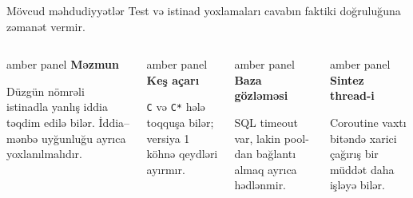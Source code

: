 \documentclass[aspectratio=169,11pt]{beamer}
\newenvironment{amberpanel}{\begin{beamercolorbox}[wd=\linewidth,sep=1.2ex,rounded=true]{amber panel}}{\end{beamercolorbox}}
\newcommand{\lead}[1]{{\color{muted}\normalsize #1}\par\vspace{0.75em}}
\begin{document}
\begin{frame}{Mövcud məhdudiyyətlər}
  \lead{Test və istinad yoxlamaları cavabın faktiki doğruluğuna zəmanət vermir.}
  \begin{columns}[T,onlytextwidth]
      \begin{amberpanel}
        \textbf{Məzmun}\par
        \small Düzgün nömrəli istinadla yanlış iddia təqdim edilə bilər. İddia–mənbə uyğunluğu ayrıca yoxlanılmalıdır.
      \end{amberpanel}
      \vspace{2mm}
      \begin{amberpanel}
        \textbf{Keş açarı}\par
        \small \texttt{C} və \texttt{C*} hələ toqquşa bilər; versiya 1 köhnə qeydləri ayırmır.
      \end{amberpanel}
      \begin{amberpanel}
        \textbf{Baza gözləməsi}\par
        \small SQL timeout var, lakin pool-dan bağlantı almaq ayrıca hədlənmir.
      \end{amberpanel}
      \vspace{2mm}
      \begin{amberpanel}
        \textbf{Sintez thread-i}\par
        \small Coroutine vaxtı bitəndə xarici çağırış bir müddət daha işləyə bilər.
      \end{amberpanel}
  \end{columns}
\end{frame}
\end{document}

